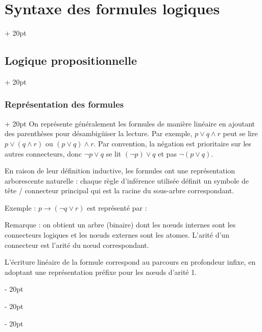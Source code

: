 \documentclass[a4paper, 12pt, twoside]{article}
\newcommand{\ind}[1][20pt]{\advance\leftskip + #1}
\newcommand{\deind}[1][20pt]{\advance\leftskip - #1}
\newenvironment{indt}[2][20pt]{#2 \par \ind[#1]}{\par \deind} %
\begin{document}
\begin{indt}{\section{Syntaxe des formules logiques}}
\begin{indt}{\subsection{Logique propositionnelle}}
            \vspace{12pt}
            
            \begin{indt}{\subsubsection{Représentation des formules}}
                On représente généralement les formules de manière linéaire en ajoutant des parenthèses pour désambigüiser la lecture. Par exemple, $p \vee q \wedge r$ peut se lire $p \vee (q \wedge r)$ ou $(p \vee q) \wedge r$. Par convention, la négation est prioritaire sur les autres connecteurs, donc $\neg p \vee q$ se lit $(\neg p) \vee q$ et pas $\neg (p \vee q)$.
                
                \vspace{12pt}
                
                En raison de leur définition inductive, les formules ont une représentation arborescente naturelle : chaque règle d'inférence utilisée définit un symbole de tête / connecteur principal qui est la racine du sous-arbre correspondant.
                
                \vspace{12pt}
                
                Exemple : $p \rightarrow (\neg q \vee r)$ est représenté par :
                
                \begin{center}
                \end{center}
                
                Remarque : on obtient un arbre (binaire) dont les n\oe uds internes sont les connecteurs logiques et les n\oe uds externes sont les atomes. L'arité d'un connecteur est l'arité du n\oe ud correspondant.
                
                L'écriture linéaire de la formule correspond au parcours en profondeur infixe, en adoptant une représentation préfixe pour les n\oe uds d'arité 1.
                

\end{indt}
\end{indt}
\end{indt}
\end{document}
